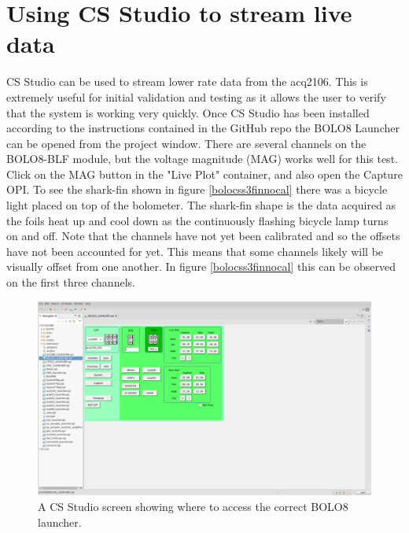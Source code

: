 \documentclass{article}
\begin{document}
\newpage

\section{Using CS Studio to stream live data}
CS Studio can be used to stream lower rate data from the acq2106.
This is extremely useful for initial validation and testing as it allows the user to verify that the system is working very quickly.
Once CS Studio has been installed according to the instructions contained in the GitHub repo the BOLO8 Launcher can be opened from the project window.
There are several channels on the BOLO8-BLF module, but the voltage magnitude (MAG) works well for this test.
Click on the MAG button in the "Live Plot" container, and also open the Capture OPI.
To see the shark-fin shown in figure \ref{bolocss3finnocal} there was a bicycle light placed on top of the bolometer.
The shark-fin shape is the data acquired as the foils heat up and cool down as the continuously flashing bicycle lamp turns on and off.
Note that the channels have not yet been calibrated and so the offsets have not been accounted for yet.
This means that some channels likely will be visually offset from one another.
In figure \ref{bolocss3finnocal} this can be observed on the first three channels.

\begin{figure}
	\centering
	\includegraphics[width=5.0in]{images/css_launcher.png}
	\caption{A CS Studio screen showing where to access the correct BOLO8 launcher.}
	\label{bolocsslauncher}
\end{figure}
\end{document}
